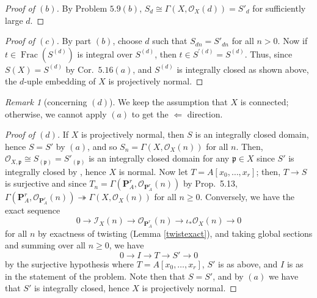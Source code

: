 \documentclass[12pt,letterpaper]{article}
\theoremstyle{definition}
\theoremstyle{remark}
\newtheorem*{remark}{Remark}
\numberwithin{equation}{section}
\numberwithin{figure}{problem}
\DeclareMathOperator{\Frac}{Frac}
\newcommand{\II}{\mathscr{I}}
\newcommand{\OO}{\mathcal{O}}
\begin{document}
\begin{proof}[Proof of $(b)$]
  By Problem $5.9(b)$, $S_d \cong \Gamma(X,\OO_X(d)) = S'_d$ for sufficiently large $d$.
\end{proof}
\begin{proof}[Proof of $(c)$]
  By part $(b)$, choose $d$ such that $S_{dn} = S'_{dn}$ for all $n > 0$. Now if $t \in \Frac(S^{(d)})$ is integral over $S^{(d)}$, then $t \in S^{\prime(d)} = S^{(d)}$. Thus, since $S(X) = S^{(d)}$ by Cor.~$5.16(a)$, and $S^{(d)}$ is integrally closed as shown above, the $d$-uple embedding of $X$ is projectively normal.
\end{proof}
\begin{remark}[concerning $(d)$]
  We keep the assumption that $X$ is connected; otherwise, we cannot apply $(a)$ to get the $\Leftarrow$ direction.
\end{remark}
\begin{proof}[Proof of $(d)$]
  If $X$ is projectively normal, then $S$ is an integrally closed domain, hence $S = S'$ by $(a)$, and so $S_n = \Gamma(X,\OO_X(n))$ for all $n$. Then, $\OO_{X,\mathfrak{p}} \cong S_{(\mathfrak{p})} = S'_{(\mathfrak{p})}$ is an integrally closed domain for any $\mathfrak{p} \in X$ since $S'$ is integrally closed by \cite[Prop.~5.13]{AM69}, hence $X$ is normal. Now let $T = A[x_0,\ldots,x_r]$; then, $T \to S$ is surjective and since $T_n = \Gamma(\mathbf{P}^r_A,\OO_{\mathbf{P}^r_A}(n))$ by Prop.~5.13, $\Gamma(\mathbf{P}^r_A,\OO_{\mathbf{P}^r_A}(n)) \twoheadrightarrow \Gamma(X,\OO_X(n))$ for all $n \ge 0$. Conversely, we have the exact sequence
  \begin{equation*}
    0 \longrightarrow \II_X(n) \longrightarrow \OO_{\mathbf{P}^r_A}(n) \longrightarrow \iota_*\OO_X(n) \longrightarrow 0
  \end{equation*}
  for all $n$ by exactness of twisting (Lemma \ref{twistexact}), and taking global sections and summing over all $n \ge 0$, we have
  \begin{equation*}
    0 \longrightarrow I \longrightarrow T \longrightarrow S' \longrightarrow 0
  \end{equation*}
  by the surjective hypothesis where $T = A[x_0,\ldots,x_r]$, $S'$ is as above, and $I$ is as in the statement of the problem. Note then that $S = S'$, and by $(a)$ we have that $S'$ is integrally closed, hence $X$ is projectively normal.
\end{proof}
\end{document}
